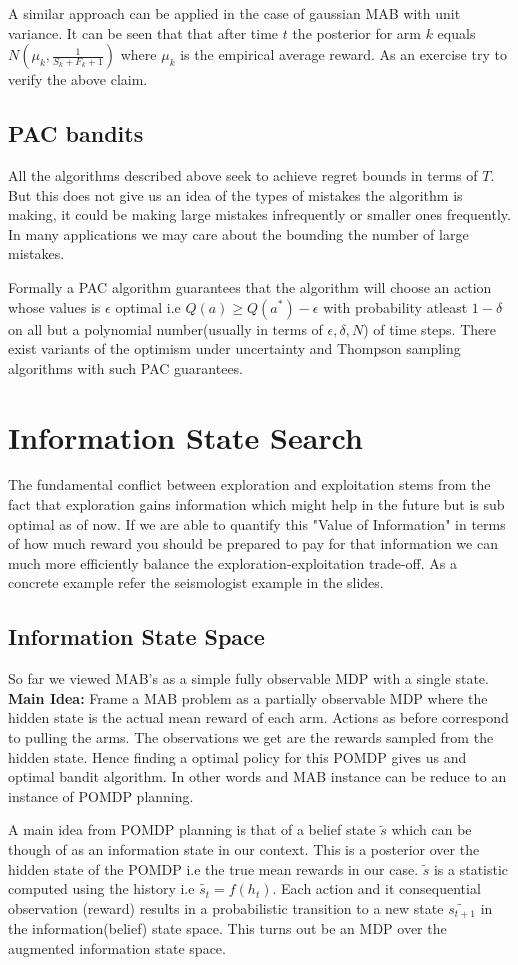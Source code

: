 \documentclass{article}
\begin{document}
A similar approach can be applied in the case of gaussian MAB with unit variance. It can be seen that that after time $t$ the posterior for arm $k$ equals $N(\mu_k,\frac{1}{S_k+F_k+1})$ where $\mu_k$ is the empirical average reward. As an exercise try to verify the above claim.
\subsection{PAC bandits}
All the algorithms described above seek to achieve regret bounds in terms of $T$. But this does not give us an idea of the types of mistakes the algorithm is making, it could be making large mistakes infrequently or smaller ones frequently. In many applications we may care about the bounding the number of large mistakes. \par
Formally a PAC algorithm guarantees that the algorithm will choose an action whose values is $\epsilon$ optimal i.e $Q(a)\geq Q(a^*)-\epsilon$ with probability atleast $1-\delta$ on all but a polynomial number(usually in terms of $\epsilon,\delta,N$) of time steps.
There exist variants of the optimism under uncertainty and Thompson sampling algorithms with such PAC guarantees.
\section{Information State Search}
The fundamental conflict between exploration and exploitation stems from the fact that exploration gains information which might help in the future but is sub optimal as of now. If we are able to quantify this "Value of Information" in terms of how much reward you should be prepared to pay for that information we can much more efficiently balance the exploration-exploitation trade-off. As a concrete example refer the seismologist example in the slides.
\subsection{Information State Space}
So far we viewed MAB's as a simple fully observable MDP with a single state. \\
\textbf{Main Idea:} Frame a MAB problem as a partially observable MDP where the hidden state is the actual mean reward of each arm. Actions as before correspond to  pulling the arms. The observations we get are the rewards sampled from the hidden state. Hence finding a optimal policy for this POMDP gives us and optimal bandit algorithm. In other words and MAB instance can be reduce to an instance of POMDP planning. 
\par 
A main idea from POMDP planning is that of a belief state $\tilde{s}$ which can be though of as an information state in our context. This is a posterior  over the hidden state of the POMDP i.e the true mean rewards in our case. $\tilde{s}$ is a statistic computed using the history i.e $\tilde{s_t}=f(h_t)$. Each action and it consequential observation (reward) results in a probabilistic transition to a new state $\tilde{s_{t+1}}$ in the information(belief) state space. This turns out be an MDP over the augmented information state space.
\end{document}
